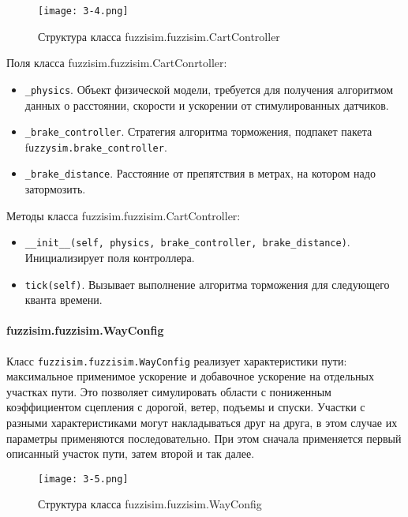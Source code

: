 \begin{figure}[ht]
	\centering
	\texttt{[image: 3-4.png]}
	\caption{ Структура класса fuzzisim.fuzzisim.CartController }
\end{figure}

Поля класса fuzzisim.fuzzisim.CartConrtoller:
\begin{itemize}
	\item  \lstinline!_physics!. Объект физической модели, требуется для получения алгоритмом данных о расстоянии, скорости и ускорении от стимулированных датчиков.
	\item  \lstinline!_brake_controller!. Стратегия алгоритма торможения, подпакет пакета f\lstinline!uzzysim.brake_controller!.
	\item  \lstinline!_brake_distance!. Расстояние от препятствия в метрах, на котором надо затормозить.
\end{itemize}
Методы класса fuzzisim.fuzzisim.CartController:
\begin{itemize}
	\item  \lstinline!__init__(self, physics, brake_controller, brake_distance)!. Инициализирует поля контроллера.
	\item  \lstinline!tick(self)!.  Вызывает выполнение алгоритма торможения для следующего кванта времени.
\end{itemize}


\paragraph{fuzzisim.fuzzisim.WayConfig}

Класс \lstinline!fuzzisim.fuzzisim.WayConfig! реализует характеристики пути: максимальное применимое ускорение и добавочное ускорение на отдельных участках пути. Это позволяет симулировать области с пониженным коэффициентом сцепления с дорогой, ветер, подъемы и спуски. Участки  с разными характеристиками могут накладываться друг на друга, в этом случае их параметры применяются последовательно. При этом сначала применяется первый описанный участок пути, затем второй и так далее.

\begin{figure}[ht]
	\centering
	\texttt{[image: 3-5.png]}
	\caption{ Структура класса fuzzisim.fuzzisim.WayConfig}
\end{figure}

